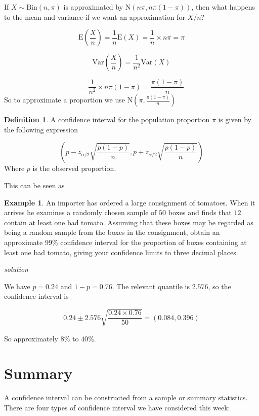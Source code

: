 \documentclass[
]{book}
\theoremstyle{definition}
\newtheorem{definition}{Definition}[chapter]
\theoremstyle{definition}
\newtheorem{example}{Example}[chapter]
\theoremstyle{definition}
\theoremstyle{definition}
\theoremstyle{remark}
\begin{document}
If \(X\sim \text{Bin}(n,\pi)\) is approximated by \(\text{N}(n\pi,n\pi(1-\pi))\), then what happens to the mean and variance if we want an approximation for \(X/n\)?

\[\text{E}\left(\frac{X}{n}\right) = \frac{1}{n}\text{E}(X)=\frac{1}{n}\times n\pi = \pi\]

\[\text{Var}\left(\frac{X}{n}\right) = \frac{1}{n^2}\text{Var}(X)\]

\[= \frac{1}{n^2}\times n\pi(1-\pi) = \frac{\pi(1-\pi)}{n}\]
So to approximate a proportion we use \(\text{N}(\pi,\frac{\pi(1-\pi)}{n})\)

\begin{definition}
A confidence interval for the population proportion \(\pi\) is given by the following expression

\[\left(p - z_{\alpha/2}\sqrt{\frac{p(1-p)}{n}}, p + z_{\alpha/2}\sqrt{\frac{p(1-p)}{n}}\right)\]
Where \(p\) is the observed proportion.
\end{definition}

This can be seen as

\begin{example}
An importer has ordered a large consignment of tomatoes. When it arrives he examines a randomly chosen sample of \(50\) boxes and finds that \(12\) contain at least one bad tomato. Assuming that these boxes may be regarded as being a random sample from the boxes in the consignment, obtain an approximate \(99\%\) confidence interval for the proportion of boxes containing at least one bad tomato, giving your confidence limits to three decimal places.
\end{example}

\emph{solution}

We have \(p=0.24\) and \(1-p = 0.76\). The relevant quantile is \(2.576\), so the confidence interval is

\[0.24 \pm 2.576\sqrt{\frac{0.24\times 0.76}{50}} = (0.084,0.396) \]

So approximately \(8\%\) to \(40\%\).

\hypertarget{summary}{%
\section{Summary}\label{summary}}

A confidence interval can be constructed from a sample or summary statistics. There are four types of confidence interval we have considered this week:
\end{document}
